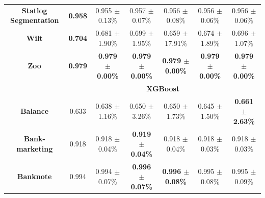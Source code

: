 \documentclass[preprint,12pt]{elsarticle}
\begin{document}
\begin{table}
{\begin{tabular}{ccccccc}
\textbf{Statlog   Segmentation} & {\color[HTML]{FE0000} \textbf{0.958}} & 0.955 $\pm$ 0.13\%                                 & 0.957 $\pm$ 0.07\%                                 & 0.956 $\pm$ 0.08\%                                 & 0.956 $\pm$ 0.06\%                                 & 0.956 $\pm$ 0.06\%                                 \\
\textbf{Wilt}                   & {\color[HTML]{FE0000} \textbf{0.704}} & 0.681 $\pm$ 1.90\%                                 & 0.699 $\pm$ 1.95\%                                 & 0.659 $\pm$ 17.91\%                                & 0.674 $\pm$ 1.89\%                                 & 0.696 $\pm$ 1.07\%                                 \\
\textbf{Zoo}                    & {\color[HTML]{FE0000} \textbf{0.979}} & {\color[HTML]{FE0000} \textbf{0.979 $\pm$ 0.00\%}} & {\color[HTML]{FE0000} \textbf{0.979 $\pm$ 0.00\%}} & {\color[HTML]{FE0000} \textbf{0.979 $\pm$ 0.00\%}} & {\color[HTML]{FE0000} \textbf{0.979 $\pm$ 0.00\%}} & {\color[HTML]{FE0000} \textbf{0.979 $\pm$ 0.00\%}} \\ \hline
\textbf{}                       & \multicolumn{6}{c}{\textbf{XGBoost}}                                                                                                                                                                                                                                                       \\ \hline
\textbf{Balance}                & 0.633                                 & 0.638 $\pm$ 1.16\%                                 & 0.650 $\pm$ 3.26\%                                 & 0.650 $\pm$ 1.73\%                                 & 0.645 $\pm$ 1.50\%                                 & {\color[HTML]{FE0000} \textbf{0.661 $\pm$ 2.63\%}} \\
\textbf{Bank-marketing}         & 0.918                                 & 0.918 $\pm$ 0.04\%                                 & {\color[HTML]{FE0000} \textbf{0.919 $\pm$ 0.04\%}} & 0.918 $\pm$ 0.04\%                                 & 0.918 $\pm$ 0.03\%                                 & 0.918 $\pm$ 0.03\%                                 \\
\textbf{Banknote}               & 0.994                                 & 0.994 $\pm$ 0.07\%                                 & \textbf{0.996 $\pm$ 0.07\%}                        & {\color[HTML]{FE0000} \textbf{0.996 $\pm$ 0.08\%}} & 0.995 $\pm$ 0.08\%                                 & 0.995 $\pm$ 0.09\%                                 \\

\end{tabular}}
\end{table}
\end{document}
